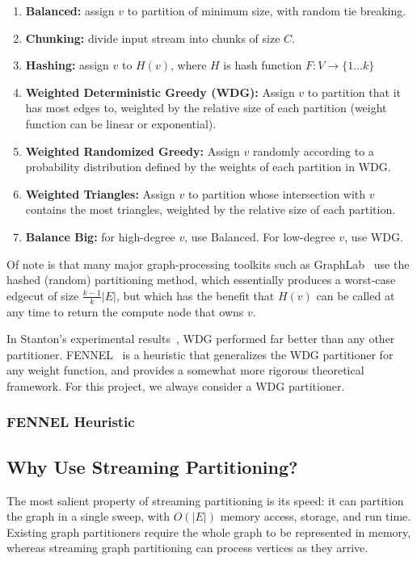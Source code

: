 \documentclass[11pt]{article}
\begin{document}
\begin{enumerate}
\item \textbf{Balanced:} assign $v$ to partition of minimum size, with random tie breaking.
\item \textbf{Chunking:} divide input stream into chunks of size $C$.
\item \textbf{Hashing:} assign $v$ to $H(v)$, where $H$ is hash function $F:V\to\{1\dots k\}$
\item \textbf{Weighted Deterministic Greedy (WDG):} Assign $v$ to partition that it has most edges to, weighted by the relative size of each partition (weight function can be linear or exponential).
\item \textbf{Weighted Randomized Greedy:} Assign $v$ randomly according to a probability distribution defined by the weights of each partition in WDG.
\item \textbf{Weighted Triangles:} Assign $v$ to partition whose intersection with $v$ contains the most triangles, weighted by the relative size of each partition.
\item \textbf{Balance Big:} for high-degree $v$, use Balanced. For low-degree $v$, use WDG. 
\end{enumerate}

Of note is that many major graph-processing toolkits such as GraphLab~\cite{Low:2012:DGF:2212351.2212354} use the hashed (random) partitioning method, which essentially produces a worst-case edgecut of size $\frac{k-1}{k}|E|$, but which has the benefit that $H(v)$ can be called at any time to return the compute node that owns $v$. 

In Stanton's experimental results~\cite{Stanton:2012:SGP:2339530.2339722}, WDG performed far better than any other partitioner. FENNEL~\cite{tsourakakis2012fennel} is a heuristic that generalizes the WDG partitioner for any weight function, and provides a somewhat more rigorous theoretical framework. For this project, we always consider a WDG partitioner. 

\subsubsection{FENNEL Heuristic}

\subsection{Why Use Streaming Partitioning?}
The most salient property of streaming partitioning is its speed: it can partition the graph in a single sweep, with $O(|E|)$ memory access, storage, and run time. Existing graph partitioners require the whole graph to be represented in memory, whereas streaming graph partitioning can process vertices as they arrive.
\end{document}
